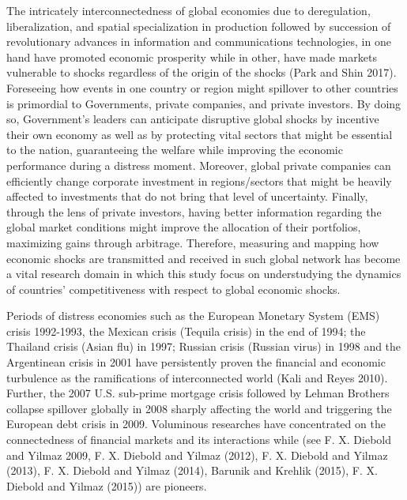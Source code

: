 \documentclass[]{elsarticle} %
\begin{document}
The intricately interconnectedness of global economies due to
deregulation, liberalization, and spatial specialization in production
followed by succession of revolutionary advances in information and
communications technologies, in one hand have promoted economic
prosperity while in other, have made markets vulnerable to shocks
regardless of the origin of the shocks (Park and Shin 2017). Foreseeing
how events in one country or region might spillover to other countries
is primordial to Governments, private companies, and private investors.
By doing so, Government's leaders can anticipate disruptive global
shocks by incentive their own economy as well as by protecting vital
sectors that might be essential to the nation, guaranteeing the welfare
while improving the economic performance during a distress moment.
Moreover, global private companies can efficiently change corporate
investment in regions/sectors that might be heavily affected to
investments that do not bring that level of uncertainty. Finally,
through the lens of private investors, having better information
regarding the global market conditions might improve the allocation of
their portfolios, maximizing gains through arbitrage. Therefore,
measuring and mapping how economic shocks are transmitted and received
in such global network has become a vital research domain in which this
study focus on understudying the dynamics of countries' competitiveness
with respect to global economic shocks.

Periods of distress economies such as the European Monetary System (EMS)
crisis 1992-1993, the Mexican crisis (Tequila crisis) in the end of
1994; the Thailand crisis (Asian flu) in 1997; Russian crisis (Russian
virus) in 1998 and the Argentinean crisis in 2001 have persistently
proven the financial and economic turbulence as the ramifications of
interconnected world (Kali and Reyes 2010). Further, the 2007 U.S.
sub-prime mortgage crisis followed by Lehman Brothers collapse spillover
globally in 2008 sharply affecting the world and triggering the European
debt crisis in 2009. Voluminous researches have concentrated on the
connectedness of financial markets and its interactions while (see F. X.
Diebold and Yilmaz 2009, F. X. Diebold and Yilmaz (2012), F. X. Diebold
and Yilmaz (2013), F. X. Diebold and Yilmaz (2014), Barunik and Krehlik
(2015), F. X. Diebold and Yilmaz (2015)) are pioneers.
\end{document}
